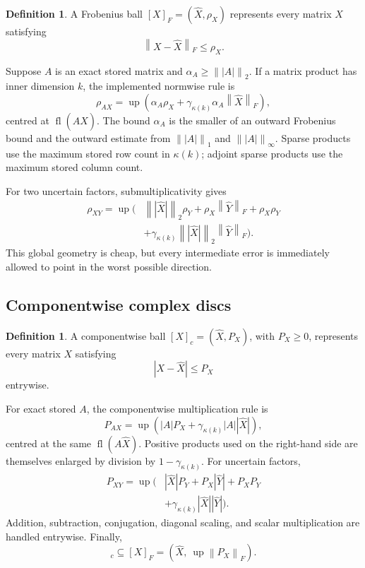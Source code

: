 \documentclass[11pt]{article}
\theoremstyle{definition}
\newtheorem{definition}[theorem]{Definition}
\theoremstyle{remark}
\newcommand{\fl}{\operatorname{fl}}
\newcommand{\up}{\operatorname{up}}
\newcommand{\norm}[1]{\left\lVert#1\right\rVert}
\begin{document}
\begin{definition}
A Frobenius ball \([X]_F=(\widehat X,\rho_X)\) represents every matrix
\(X\) satisfying
\[
 \norm{X-\widehat X}_F\leq\rho_X.
\]
\end{definition}

Suppose \(A\) is an exact stored matrix and
\(\alpha_A\geq\norm{|A|}_2\).  If a matrix product has inner dimension
\(k\), the implemented normwise rule is
\begin{equation}
 \rho_{AX}
 =\up\!\left(
 \alpha_A\rho_X+\gamma_{\kappa(k)}\alpha_A
 \norm{\widehat X}_F
 \right),
 \label{eq:normwise-product}
\end{equation}
centred at \(\fl(A\widehat X)\).  The bound \(\alpha_A\) is the smaller of
an outward Frobenius bound and the outward estimate from
\(\norm{|A|}_1\) and \(\norm{|A|}_\infty\).  Sparse products use the maximum
stored row count in \(\kappa(k)\); adjoint sparse products use the maximum
stored column count.

For two uncertain factors, submultiplicativity gives
\begin{align}
 \rho_{XY}=\up\big(&
 \norm{|\widehat X|}_2\rho_Y
 +\rho_X\norm{\widehat Y}_F
 +\rho_X\rho_Y \\
 &+\gamma_{\kappa(k)}\norm{|\widehat X|}_2
 \norm{\widehat Y}_F\big).
 \label{eq:normwise-uncertain-product}
\end{align}
This global geometry is cheap, but every intermediate error is immediately
allowed to point in the worst possible direction.

\subsection{Componentwise complex discs}

\begin{definition}
A componentwise ball \([X]_c=(\widehat X,P_X)\), with \(P_X\geq0\),
represents every matrix \(X\) satisfying
\[
 |X-\widehat X|\leq P_X
\]
entrywise.
\end{definition}

For exact stored \(A\), the componentwise multiplication rule is
\begin{equation}
 P_{AX}=\up\!\left(
 |A|P_X+\gamma_{\kappa(k)}|A||\widehat X|
 \right),
 \label{eq:component-product}
\end{equation}
centred at the same \(\fl(A\widehat X)\).  Positive products used on the
right-hand side are themselves enlarged by division by
\(1-\gamma_{\kappa(k)}\).  For uncertain factors,
\begin{align}
 P_{XY}=\up\big(&|\widehat X|P_Y+P_X|\widehat Y|+P_XP_Y \\
 &+\gamma_{\kappa(k)}|\widehat X||\widehat Y|\big).
 \label{eq:component-uncertain-product}
\end{align}
Addition, subtraction, conjugation, diagonal scaling, and scalar
multiplication are handled entrywise.  Finally,
\begin{equation}
 [X]_c\subseteq
 [X]_F=\left(\widehat X,\ \up\norm{P_X}_F\right).
 \label{eq:component-to-frobenius}
\end{equation}
\end{document}
